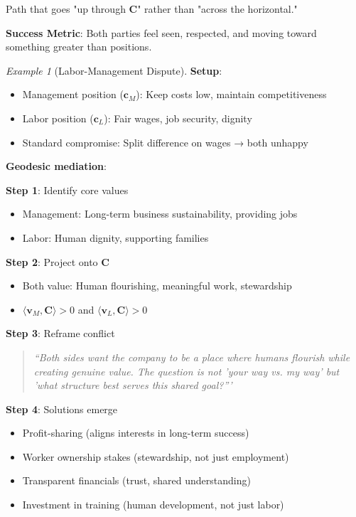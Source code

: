 \documentclass[11pt,a4paper]{article}
\theoremstyle{definition}
\theoremstyle{remark}
\newtheorem{example}{Example}[section]
\newcommand{\cc}{\mathbf{c}}
\begin{document}
\begin{small}
\begin{enumerate}
\begin{protocol}
\begin{enumerate}
        Path that goes "up through \(\mathbf{C}\)" rather than "across the horizontal."
\end{enumerate}

\textbf{Success Metric}: Both parties feel seen, respected, and moving toward something greater than positions.
\end{protocol}

\begin{example}[Labor-Management Dispute]
\textbf{Setup}:
\begin{itemize}
    \item Management position (\(\cc_M\)): Keep costs low, maintain competitiveness
    \item Labor position (\(\cc_L\)): Fair wages, job security, dignity
    \item Standard compromise: Split difference on wages → both unhappy
\end{itemize}

\textbf{Geodesic mediation}:

\textbf{Step 1}: Identify core values
\begin{itemize}
    \item Management: Long-term business sustainability, providing jobs
    \item Labor: Human dignity, supporting families
\end{itemize}

\textbf{Step 2}: Project onto \(\mathbf{C}\)
\begin{itemize}
    \item Both value: Human flourishing, meaningful work, stewardship
    \item \(\langle \mathbf{v}_M, \mathbf{C} \rangle > 0\) and \(\langle \mathbf{v}_L, \mathbf{C} \rangle > 0\)
\end{itemize}

\textbf{Step 3}: Reframe conflict
\begin{quote}
\textit{``Both sides want the company to be a place where humans flourish while creating genuine value. The question is not 'your way vs. my way' but 'what structure best serves this shared goal?'''}
\end{quote}

\textbf{Step 4}: Solutions emerge
\begin{itemize}
    \item Profit-sharing (aligns interests in long-term success)
    \item Worker ownership stakes (stewardship, not just employment)
    \item Transparent financials (trust, shared understanding)
    \item Investment in training (human development, not just labor)
\end{itemize}


\end{example}
\end{enumerate}
\end{small}
\end{document}
